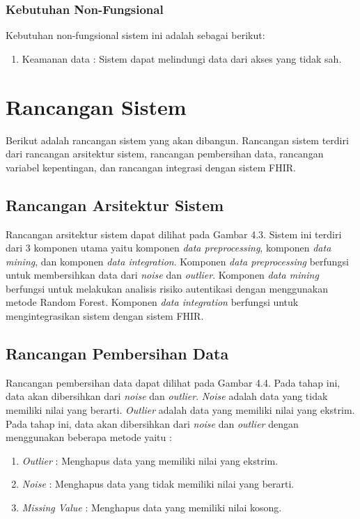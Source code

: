 \subsubsection{Kebutuhan Non-Fungsional}
Kebutuhan non-fungsional sistem ini adalah sebagai berikut:
\begin{enumerate}
    \item Keamanan data : Sistem dapat melindungi data dari akses yang tidak sah.
\end{enumerate}

\section{Rancangan Sistem}
Berikut adalah rancangan sistem yang akan dibangun. Rancangan sistem terdiri dari rancangan arsitektur sistem, rancangan pembersihan data, rancangan variabel kepentingan, dan rancangan integrasi dengan sistem FHIR.

\subsection{Rancangan Arsitektur Sistem}
Rancangan arsitektur sistem dapat dilihat pada Gambar 4.3. Sistem ini terdiri dari 3 komponen utama yaitu komponen \textit{data preprocessing}, komponen \textit{data mining}, dan komponen \textit{data integration}. Komponen \textit{data preprocessing} berfungsi untuk membersihkan data dari \textit{noise} dan \textit{outlier}. Komponen \textit{data mining} berfungsi untuk melakukan analisis risiko autentikasi dengan menggunakan metode Random Forest. Komponen \textit{data integration} berfungsi untuk mengintegrasikan sistem dengan sistem FHIR.

\subsection{Rancangan Pembersihan Data}
Rancangan pembersihan data dapat dilihat pada Gambar 4.4. Pada tahap ini, data akan dibersihkan dari \textit{noise} dan \textit{outlier}. \textit{Noise} adalah data yang tidak memiliki nilai yang berarti. \textit{Outlier} adalah data yang memiliki nilai yang ekstrim. Pada tahap ini, data akan dibersihkan dari \textit{noise} dan \textit{outlier} dengan menggunakan beberapa metode yaitu :
\begin{enumerate}
    \item \textit{Outlier} : Menghapus data yang memiliki nilai yang ekstrim.
    \item \textit{Noise} : Menghapus data yang tidak memiliki nilai yang berarti.
    \item \textit{Missing Value} : Menghapus data yang memiliki nilai kosong.
\end{enumerate}

